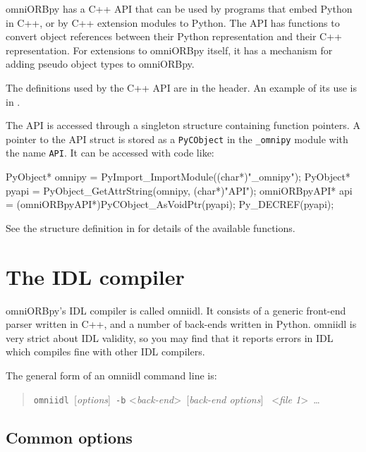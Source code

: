 \documentclass[11pt,oneside,a4paper]{book}
\newcommand{\module}[1]{\texttt{#1}}
\newcommand{\code}[1]{\texttt{#1}}
\newcommand{\cmdline}[1]{\texttt{#1}}
\begin{document}
omniORBpy has a C++ API that can be used by programs that embed Python
in C++, or by C++ extension modules to Python. The API has functions
to convert object references between their Python representation and
their C++ representation. For extensions to omniORBpy itself, it has a
mechanism for adding pseudo object types to omniORBpy.

The definitions used by the C++ API are in the 
header. An example of its use is in .

The API is accessed through a singleton structure containing function
pointers. A pointer to the API struct is stored as a \code{PyCObject}
in the \module{\_omnipy} module with the name \code{API}. It can be
accessed with code like:

\begin{cxxlisting}
PyObject*     omnipy = PyImport_ImportModule((char*)"_omnipy");
PyObject*     pyapi  = PyObject_GetAttrString(omnipy, (char*)"API");
omniORBpyAPI* api    = (omniORBpyAPI*)PyCObject_AsVoidPtr(pyapi);
Py_DECREF(pyapi);
\end{cxxlisting}

\noindent See the structure definition in  for
details of the available functions.



\chapter{The IDL compiler}
\label{chap:omniidl}

omniORBpy's IDL compiler is called omniidl. It consists of a generic
front-end parser written in C++, and a number of back-ends written in
Python. omniidl is very strict about IDL validity, so you may find
that it reports errors in IDL which compiles fine with other IDL
compilers.

The general form of an omniidl command line is:

\begin{quote} %
\cmdline{omniidl }[\textit{options}]\cmdline{ -b}%
<\textit{back-end}>\cmdline{ }[\textit{back-end options}]%
\cmdline{ }<\textit{file 1}>\cmdline{ }\dots
\end{quote}

\section{Common options}
\end{document}

